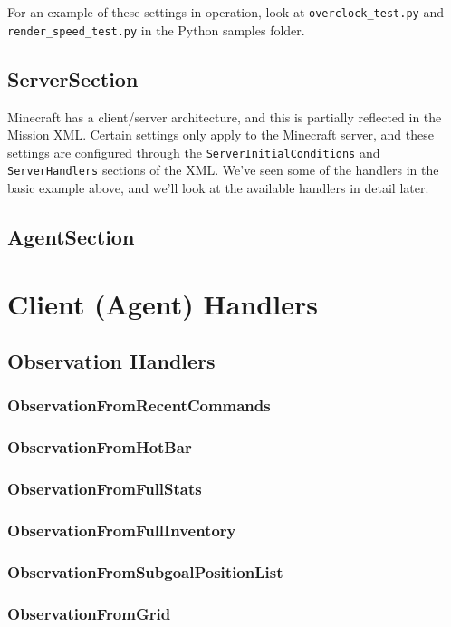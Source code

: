 \documentclass[11pt]{article} %
\begin{document}
For an example of these settings in operation, look at \lstinline!overclock_test.py! and \lstinline!render_speed_test.py! in the Python samples folder.

\subsection{ServerSection}

Minecraft has a client/server architecture, and this is partially reflected in the Mission XML. Certain settings only apply to the Minecraft server, and these settings are configured through the \lstinline!ServerInitialConditions! and \lstinline!ServerHandlers! sections of the XML. We've seen some of the handlers in the basic example above, and we'll look at the available handlers in detail later.

\subsection{AgentSection}

\section{Client (Agent) Handlers}

\subsection{Observation Handlers}

\subsubsection{ObservationFromRecentCommands}
\subsubsection{ObservationFromHotBar}
\subsubsection{ObservationFromFullStats}
\subsubsection{ObservationFromFullInventory}
\subsubsection{ObservationFromSubgoalPositionList}
\subsubsection{ObservationFromGrid}
\end{document}
